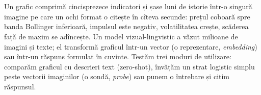 \section{}
\begin{intuition}
%
{Un grafic comprimă cincisprezece indicatori și șase luni de istorie într-o singură imagine pe care un ochi format o citește în cîteva secunde: prețul coboară spre banda Bollinger inferioară, impulsul este negativ, volatilitatea crește, scăderea față de maxim se adîncește.
Un model vizual-lingvistic a văzut milioane de imagini și texte; el transformă graficul într-un vector (o reprezentare, \emph{embedding}) sau într-un răspuns formulat în cuvinte.
Testăm trei moduri de utilizare: comparăm graficul cu descrieri text (zero-shot), învățăm un strat logistic simplu peste vectorii imaginilor (o sondă, \emph{probe}) sau punem o întrebare și citim răspunsul.}
\end{intuition}
